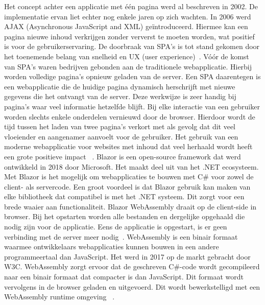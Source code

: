 \documentclass{hogent-article}
\begin{document}

Het concept achter een applicatie met één pagina werd al beschreven in 2002. De implementatie ervan liet echter nog enkele jaren op zich wachten. In 2006 werd AJAX (Asynchronous JavaScript and XML) geïntroduceerd. Hiermee kan een pagina nieuwe inhoud verkrijgen zonder ververst te moeten worden, wat positief is voor de gebruikerservaring.  De doorbraak van SPA's is tot stand gekomen door het toenemende belang van snelheid en UX (user experience)~\autocite{Cwik2021}.
\newline\newline
Vóór de komst van SPA's waren bedrijven gebonden aan de traditionele webapplicatie. Hierbij worden volledige pagina's opnieuw geladen van de server. Een SPA daarentegen is een webapplicatie die de huidige pagina dynamisch herschrijft met nieuwe gegevens die het ontvangt van de server. Deze werkwijze is zeer handig bij pagina's waar veel informatie hetzelfde blijft. Bij elke interactie van een gebruiker worden slechts enkele onderdelen vernieuwd door de browser. Hierdoor wordt de tijd tussen het laden van twee pagina's verkort met als gevolg dat dit veel vloeiender en aangenamer aanvoelt voor de gebruiker. Het gebruik van een moderne webapplicatie voor websites met inhoud dat veel herhaald wordt heeft een grote positieve impact ~\autocite{Lawson2022}.
\newline\newline
Blazor is een open-source framework dat werd ontwikkeld in 2018 door Microsoft. Het maakt deel uit van het .NET ecosysteem. Met Blazor is het mogelijk om webapplicaties te bouwen met C\# voor zowel de client- als servercode. Een groot voordeel is dat Blazor gebruik kan maken van elke bibliotheek dat compatibel is met het .NET systeem. Dit zorgt voor een brede waaier aan functionaliteit. Blazor WebAssembly draait op de client-side in browser. Bij het opstarten worden alle bestanden en dergelijke opgehaald die nodig zijn voor de applicatie. Eens de applicatie is opgestart, is er geen verbinding met de server meer nodig~\autocite{Spasojevic2022}. WebAssembly is een binair formaat waarmee ontwikkelaars webapplicaties kunnen bouwen in een andere programmeertaal dan JavaScript. Het werd in 2017 op de markt gebracht door W3C. WebAssembly zorgt ervoor dat de geschreven C\#-code wordt gecompileerd naar een binair formaat dat compacter is dan JavaScript. Dit formaat wordt vervolgens in de browser geladen en uitgevoerd. Dit wordt bewerkstelligd met een WebAssembly runtime omgeving ~\autocite{Yegulalp2022}.
\end{document}
